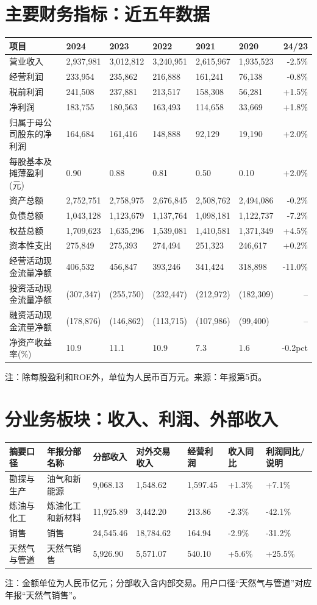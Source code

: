 \documentclass[9pt,a4paper]{ctexart}
\newcommand{\smallnote}[1]{{\scriptsize\color{Gray}#1}}
\begin{document}
\section{主要财务指标：近五年数据}
\scriptsize
\begin{tabularx}{\textwidth}{@{}lYYYYY r@{}}
\toprule
项目 & 2024 & 2023 & 2022 & 2021 & 2020 & 24/23 \\
\midrule
营业收入 & 2,937,981 & 3,012,812 & 3,240,951 & 2,615,967 & 1,935,523 & -2.5\% \\
经营利润 & 233,954 & 235,862 & 216,888 & 161,241 & 76,138 & -0.8\% \\
税前利润 & 241,508 & 237,881 & 213,517 & 158,308 & 56,281 & +1.5\% \\
净利润 & 183,755 & 180,563 & 163,493 & 114,658 & 33,669 & +1.8\% \\
归属于母公司股东的净利润 & 164,684 & 161,416 & 148,888 & 92,129 & 19,190 & +2.0\% \\
每股基本及摊薄盈利(元) & 0.90 & 0.88 & 0.81 & 0.50 & 0.10 & +2.0\% \\
资产总额 & 2,752,751 & 2,758,975 & 2,676,845 & 2,508,762 & 2,494,086 & -0.2\% \\
负债总额 & 1,043,128 & 1,123,679 & 1,137,764 & 1,098,181 & 1,122,737 & -7.2\% \\
权益总额 & 1,709,623 & 1,635,296 & 1,539,081 & 1,410,581 & 1,371,349 & +4.5\% \\
资本性支出 & 275,849 & 275,393 & 274,494 & 251,323 & 246,617 & +0.2\% \\
经营活动现金流量净额 & 406,532 & 456,847 & 393,246 & 341,424 & 318,898 & -11.0\% \\
投资活动现金流量净额 & (307,347) & (255,750) & (232,447) & (212,972) & (182,309) & -- \\
融资活动现金流量净额 & (178,876) & (146,862) & (113,715) & (107,986) & (99,400) & -- \\
净资产收益率(\%) & 10.9 & 11.1 & 10.9 & 7.3 & 1.6 & -0.2pct \\
\bottomrule
\end{tabularx}
\normalsize
\smallnote{注：除每股盈利和ROE外，单位为人民币百万元。来源：年报第5页。}

\section{分业务板块：收入、利润、外部收入}
\scriptsize
\begin{tabularx}{\textwidth}{@{}l l Y Y Y Y Y@{}}
\toprule
摘要口径 & 年报分部名称 & 分部收入 & 对外交易收入 & 经营利润 & 收入同比 & 利润同比/说明 \\
\midrule
勘探与生产 & 油气和新能源 & 9,068.13 & 1,548.62 & 1,597.45 & +1.3\% & +7.1\% \\
炼油与化工 & 炼油化工和新材料 & 11,925.89 & 3,442.20 & 213.86 & -2.3\% & -42.1\% \\
销售 & 销售 & 24,545.46 & 18,784.62 & 164.94 & -2.9\% & -31.2\% \\
天然气与管道 & 天然气销售 & 5,926.90 & 5,571.07 & 540.10 & +5.6\% & +25.5\% \\
\bottomrule
\end{tabularx}
\normalsize
\smallnote{注：金额单位为人民币亿元；分部收入含内部交易。用户口径“天然气与管道”对应年报“天然气销售”。}
\end{document}
